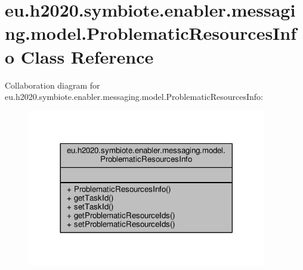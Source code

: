 \hypertarget{classeu_1_1h2020_1_1symbiote_1_1enabler_1_1messaging_1_1model_1_1ProblematicResourcesInfo}{}\section{eu.\+h2020.\+symbiote.\+enabler.\+messaging.\+model.\+Problematic\+Resources\+Info Class Reference}
\label{classeu_1_1h2020_1_1symbiote_1_1enabler_1_1messaging_1_1model_1_1ProblematicResourcesInfo}


Collaboration diagram for eu.\+h2020.\+symbiote.\+enabler.\+messaging.\+model.\+Problematic\+Resources\+Info\+:\nopagebreak
\begin{figure}[H]
\begin{center}
\leavevmode
\includegraphics[width=296pt]{classeu_1_1h2020_1_1symbiote_1_1enabler_1_1messaging_1_1model_1_1ProblematicResourcesInfo__coll__graph}
\end{center}
\end{figure}

